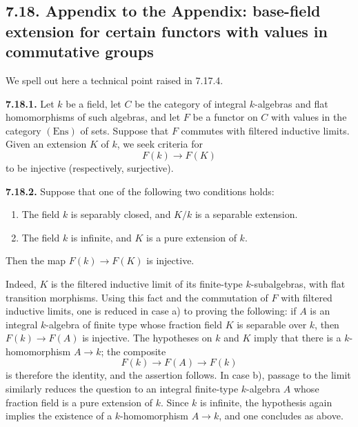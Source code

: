 \subsection*{7.18. Appendix to the Appendix: base-field extension for certain
functors with values in commutative groups}
We spell out here a technical point raised in 7.17.4.

\textbf{7.18.1.}
Let $k$ be a field, let $C$ be the category of integral $k$-algebras and
flat homomorphisms of such algebras, and let $F$ be a functor on $C$ with
values in the category $(\mathrm{Ens})$ of sets. Suppose that $F$ commutes
with filtered inductive limits. Given an extension $K$ of $k$, we seek
criteria
for
\[
F(k)\longrightarrow F(K)
\]
to be injective (respectively, surjective).

\textbf{7.18.2.}
Suppose that one of the following two conditions holds:
\begin{enumerate}[label=\alph*)]
\item The field $k$ is separably closed, and $K/k$ is a separable extension.
\item The field $k$ is infinite, and $K$ is a pure extension of $k$.
\end{enumerate}
Then the map $F(k)\to F(K)$ is injective.

Indeed, $K$ is the filtered inductive limit of its finite-type
$k$-subalgebras, with flat transition morphisms. Using this fact and the
commutation of $F$ with filtered inductive limits, one is reduced in case
a) to proving the following: if $A$ is an integral $k$-algebra of finite
type whose fraction field $K$ is separable over $k$, then
$F(k)\to F(A)$ is injective. The hypotheses on $k$ and $K$ imply that there
is a $k$-homomorphism $A\to k$; the composite
\[
F(k)\longrightarrow F(A)\longrightarrow F(k)
\]
is therefore the identity, and the assertion follows. In case b), passage
to the limit similarly reduces the question to an integral finite-type
$k$-algebra $A$ whose fraction field is a pure extension of $k$. Since $k$
is infinite, the hypothesis again implies the existence of a
$k$-homomorphism $A\to k$, and one concludes as above.

